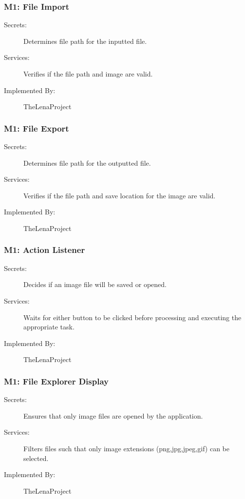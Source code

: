 \documentclass[12pt, titlepage]{article}
\begin{document}
\subsubsection{M1: File Import}

\begin{description}
	\item[Secrets:] Determines file path for the inputted file.
	\item[Services:] Verifies if the file path and image are valid.
	\item[Implemented By:] TheLenaProject
\end{description}

\subsubsection{M1: File Export}

\begin{description}
	\item[Secrets:] Determines file path for the outputted file.
	\item[Services:] Verifies if the file path and save location for the image are valid.
	\item[Implemented By:] TheLenaProject
\end{description}

\subsubsection{M1: Action Listener}

\begin{description}
	\item[Secrets:] Decides if an image file will be saved or opened.
	\item[Services:] Waits for either button to be clicked before processing and executing the appropriate task. 
	\item[Implemented By:] TheLenaProject
\end{description}

\subsubsection{M1: File Explorer Display}

\begin{description}
	\item[Secrets:]  Ensures that only image files are opened by the application.
	\item[Services:] Filters files such that only image extensions (png,jpg,jpeg,gif) can be selected. 
	\item[Implemented By:] TheLenaProject
	
\end{description}
\end{document}
